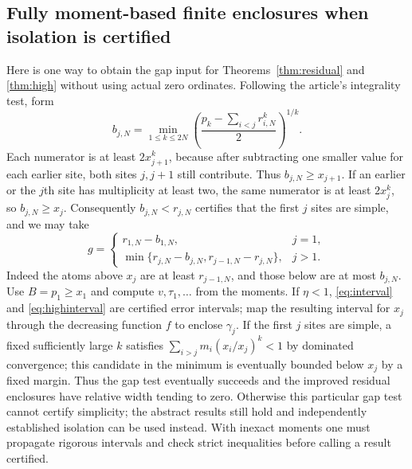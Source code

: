 \documentclass[11pt]{article}
\theoremstyle{remark}\newtheorem{remark}[theorem]{Remark}
\begin{document}
\subsection{Fully moment-based finite enclosures when isolation is certified}
Here is one way to obtain the gap input for Theorems~\ref{thm:residual} and \ref{thm:high} without using actual zero ordinates. Following the article's integrality test, form
\[
 b_{j,N}=\min_{1\le k\le 2N}\left(\frac{p_k-\sum_{i<j}r_{i,N}^{k}}{2}\right)^{1/k}.
\]
Each numerator is at least $2x_{j+1}^k$, because after subtracting one smaller value for each earlier site, both sites $j,j+1$ still contribute. Thus $b_{j,N}\ge x_{j+1}$. If an earlier or the $j$th site has multiplicity at least two, the same numerator is at least $2x_j^k$, so $b_{j,N}\ge x_j$. Consequently $b_{j,N}<r_{j,N}$ certifies that the first $j$ sites are simple, and we may take
\[
 g=\begin{cases}r_{1,N}-b_{1,N},&j=1,\\
 \min\{r_{j,N}-b_{j,N},r_{j-1,N}-r_{j,N}\},&j>1.\end{cases}
\]
Indeed the atoms above $x_j$ are at least $r_{j-1,N}$, and those below are at most $b_{j,N}$. Use $B=p_1\ge x_1$ and compute $v,\tau_1,\ldots$ from the moments. If $\eta<1$, \eqref{eq:interval} and \eqref{eq:highinterval} are certified error intervals; map the resulting interval for $x_j$ through the decreasing function $f$ to enclose $\gamma_j$. If the first $j$ sites are simple, a fixed sufficiently large $k$ satisfies $\sum_{i>j}m_i(x_i/x_j)^k<1$ by dominated convergence; this candidate in the minimum is eventually bounded below $x_j$ by a fixed margin. Thus the gap test eventually succeeds and the improved residual enclosures have relative width tending to zero. Otherwise this particular gap test cannot certify simplicity; the abstract results still hold and independently established isolation can be used instead. With inexact moments one must propagate rigorous intervals and check strict inequalities before calling a result certified.
\end{document}

